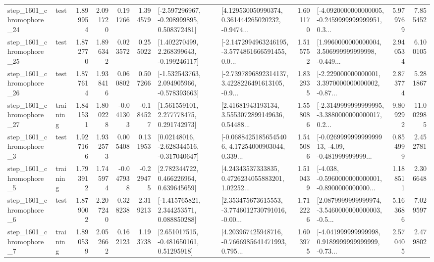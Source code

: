 \begin{tabular}{llrrrrllrlrr}
 step\_1601\_chromophore\_24 &      test &      1.899954 &    2.091720 &      0.191766 &  1.394579 &   [-2.597296967, -0.208999895, 0.508372481] &  [4.129530050990374, 0.361444265020232, -0.9474... &       1.601170 &  [-4.0920000000000005, -0.2459999999999951, 0.3... &            5.979769 &          7.855452 \\
 step\_1601\_chromophore\_25 &      test &      1.872770 &    1.896342 &      0.023572 &  0.255022 &    [1.402270499, 2.268399643, -0.199246117] &  [-2.1472994963246195, -3.5774861666591455, 0.0... &       1.515752 &  [1.9960000000000004, 3.506999999999998, -0.449... &            2.940534 &          6.100105 \\
 step\_1601\_chromophore\_26 &      test &      1.877614 &    1.938416 &      0.060802 &  0.507266 &   [-1.532543763, 2.094905966, -0.578393663] &  [-2.7397896892314137, 3.4228226491613105, -0.9... &       1.832935 &  [-2.229000000000001, 3.3970000000000002, -0.87... &            2.873774 &          5.281867 \\
 step\_1601\_chromophore\_27 &  training &      1.841531 &    1.800228 &     -0.041303 & -0.184527 &     [1.561559101, 2.277778475, 0.291742973] &  [2.41681943193134, 3.5553072899149636, 0.54488... &       1.558086 &  [-2.3149999999999995, -3.3880000000000017, 0.2... &            9.809292 &         11.002985 \\
  step\_1601\_chromophore\_3 &      test &      1.927166 &    1.932573 &      0.005408 &  0.131953 &    [0.02148016, -2.628344516, -0.317040647] &  [-0.06884251856545406, 4.17254000903044, 0.339... &       1.545086 &  [-0.026999999999999913, -4.09, -0.481999999999... &            0.854999 &          2.452781 \\
  step\_1601\_chromophore\_5 &  training &      1.793912 &    1.745974 &     -0.047938 & -0.229475 &     [2.782344722, 0.466226964, 0.639645659] &  [4.24343537333835, 0.4726234055883201, 1.02252... &       1.510439 &  [-4.038, -0.5960000000000001, -0.8900000000000... &            1.188511 &          2.306648 \\
  step\_1601\_chromophore\_6 &      test &      1.879002 &    2.207240 &      0.328238 &  2.319213 &    [-1.415765821, 2.344253571, 0.088850288] &  [2.353475673615553, -3.7746012730791016, -0.00... &       1.712226 &  [2.0879999999999974, -3.5460000000000003, -0.5... &            5.163686 &          7.029597 \\
  step\_1601\_chromophore\_7 &  training &      1.890539 &    2.052662 &      0.162123 &  1.193738 &     [2.651017515, -0.481650161, 0.51295918] &  [4.203967425948716, -0.7666985641471993, 0.795... &       1.603975 &  [-4.041999999999998, 0.9189999999999999, -0.73... &            2.570405 &          2.479802 \\

\end{tabular}
